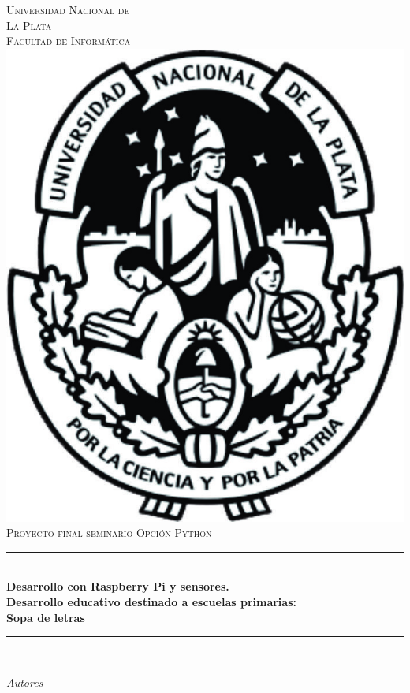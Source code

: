 \newcommand{\HRule}{\rule{\linewidth}{0.5mm}} 

\begin{titlepage}
\center
\textsc{
\Huge{Universidad Nacional de \\La Plata}\\[.5cm]
\Large
Facultad de Informática\\[1cm] 
\includegraphics[scale=0.3]{UNLP}\\[3cm]
Proyecto final seminario Opción Python}\\[.5cm] 

\sffamily
\HRule \\[0.4cm]
\textbf{\Large Desarrollo con Raspberry Pi y sensores.\\ Desarrollo educativo destinado a escuelas primarias:\\ Sopa de letras}\\[0.2cm] 
\HRule \\[3cm]
 
\large
\begin{minipage}[t]{.4\textwidth}
\begin{flushleft}
\emph{Autores}


\end{flushleft}
\end{minipage}
\end{titlepage}
